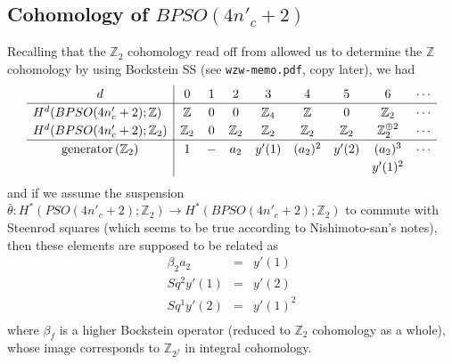 \documentclass[12pt]{article}
\numberwithin{equation}{section}
\def\bZ{\mathbb{Z}}
\begin{document}
\subsection{Cohomology of $BPSO(4n'_c+2)$}
Recalling that the $\bZ_2$ cohomology read off from \cite{KonoMimura1974}
allowed us to determine the $\bZ$ cohomology by using Bockstein SS
(see \texttt{wzw-memo.pdf}, copy later), we had
\begin{equation}
	\renewcommand{\arraystretch}{1.2}
	\begin{array}{c|cccccccccccccccc}
		d & 0 & 1 & 2 & 3 & 4 & 5 & 6 & \cdots \\
		\hline
		\multicolumn{1}{l|}{H^d(BPSO(4n'_c+2);\bZ)} & \bZ & 0 & 0 & \bZ_4 & \bZ & 0 & \bZ_2 & \cdots\\
		\multicolumn{1}{l|}{H^d(BPSO(4n'_c+2);\bZ_2)} & \bZ_2 & 0 & \bZ_2 & \bZ_2 & \bZ_2 & \bZ_2 & \bZ_2^{\oplus 2} & \cdots\\
		\hline
		\text{generator} \,(\bZ_2) & 1 & - & a_2 & y'(1) & (a_2)^2 & y'(2) & (a_2)^3 & \cdots\\
		&&&&&&& y'(1)^2\\
	\end{array}
\end{equation}
and if we assume the suspension $\bar\theta: H^\ast(PSO(4n'_c+2);\bZ_2) \to H^\ast(BPSO(4n'_c+2);\bZ_2)$
to commute with Steenrod squares (which seems to be true according to Nishimoto-san's notes),
then these elements are supposed to be related as
\begin{equation*}
	\begin{array}{ccl}
		\beta_2 a_2 & = & y'(1)\\
		Sq^2 y'(1) & = & y'(2)\\
		Sq^1 y'(2) & = & y'(1)^2\\
	\end{array}
\end{equation*}
where $\beta_f$ is a higher Bockstein operator (reduced to $\bZ_2$ cohomology as a whole),
whose image corresponds to $\bZ_{2^f}$ in integral cohomology.
\end{document}
